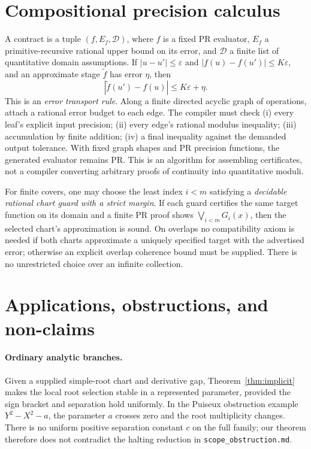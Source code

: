 \documentclass[11pt]{article}
\begin{document}
\section{Compositional precision calculus}
A contract is a tuple $(f,E_f,\mathcal D)$, where $f$ is a fixed PR evaluator, $E_f$ a primitive-recursive rational upper bound on its error, and $\mathcal D$ a finite list of quantitative domain assumptions. If $|u-u'|\le\varepsilon$ and $|f(u)-f(u')|\le K\varepsilon$, and an approximate stage $\widetilde f$ has error $\eta$, then
\[
|\widetilde f(u')-f(u)|\le K\varepsilon+\eta.
\]
This is an \emph{error transport rule}. Along a finite directed acyclic graph of operations, attach a rational error budget to each edge. The compiler must check (i) every leaf's explicit input precision; (ii) every edge's rational modulus inequality; (iii) accumulation by finite addition; (iv) a final inequality against the demanded output tolerance. With fixed graph shapes and PR precision functions, the generated evaluator remains PR. This is an algorithm for assembling certificates, not a compiler converting arbitrary proofs of continuity into quantitative moduli.

For finite covers, one may choose the least index $i<m$ satisfying a \emph{decidable rational chart guard with a strict margin}. If each guard certifies the same target function on its domain and a finite PR proof shows $\bigvee_{i<m}G_i(x)$, then the selected chart's approximation is sound. On overlaps no compatibility axiom is needed if both charts approximate a uniquely specified target with the advertised error; otherwise an explicit overlap coherence bound must be supplied. There is no unrestricted choice over an infinite collection.

\section{Applications, obstructions, and non-claims}
\paragraph{Ordinary analytic branches.} Given a supplied simple-root chart and derivative gap, Theorem~\ref{thm:implicit} makes the local root selection stable in a represented parameter, provided the sign bracket and separation hold uniformly. In the Puiseux obstruction example $Y^2-X^2-a$, the parameter $a$ crosses zero and the root multiplicity changes. There is no uniform positive separation constant $c$ on the full family; our theorem therefore does not contradict the halting reduction in \texttt{scope\_obstruction.md}.
\end{document}
